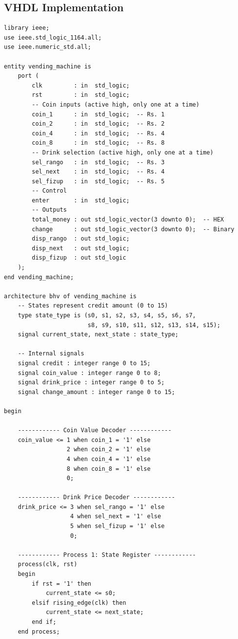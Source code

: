 \documentclass[12pt,a4paper]{article}
\begin{document}
\subsection{VHDL Implementation}

\begin{lstlisting}[caption={vending\_machine.vhd}]
library ieee;
use ieee.std_logic_1164.all;
use ieee.numeric_std.all;

entity vending_machine is
    port (
        clk         : in  std_logic;
        rst         : in  std_logic;
        -- Coin inputs (active high, only one at a time)
        coin_1      : in  std_logic;  -- Rs. 1
        coin_2      : in  std_logic;  -- Rs. 2
        coin_4      : in  std_logic;  -- Rs. 4
        coin_8      : in  std_logic;  -- Rs. 8
        -- Drink selection (active high, only one at a time)
        sel_rango   : in  std_logic;  -- Rs. 3
        sel_next    : in  std_logic;  -- Rs. 4
        sel_fizup   : in  std_logic;  -- Rs. 5
        -- Control
        enter       : in  std_logic;
        -- Outputs
        total_money : out std_logic_vector(3 downto 0);  -- HEX
        change      : out std_logic_vector(3 downto 0);  -- Binary
        disp_rango  : out std_logic;
        disp_next   : out std_logic;
        disp_fizup  : out std_logic
    );
end vending_machine;

architecture bhv of vending_machine is
    -- States represent credit amount (0 to 15)
    type state_type is (s0, s1, s2, s3, s4, s5, s6, s7, 
                        s8, s9, s10, s11, s12, s13, s14, s15);
    signal current_state, next_state : state_type;
    
    -- Internal signals
    signal credit : integer range 0 to 15;
    signal coin_value : integer range 0 to 8;
    signal drink_price : integer range 0 to 5;
    signal change_amount : integer range 0 to 15;
    
begin

    ------------ Coin Value Decoder ------------
    coin_value <= 1 when coin_1 = '1' else
                  2 when coin_2 = '1' else
                  4 when coin_4 = '1' else
                  8 when coin_8 = '1' else
                  0;

    ------------ Drink Price Decoder ------------
    drink_price <= 3 when sel_rango = '1' else
                   4 when sel_next = '1' else
                   5 when sel_fizup = '1' else
                   0;

    ------------ Process 1: State Register ------------
    process(clk, rst)
    begin
        if rst = '1' then
            current_state <= s0;
        elsif rising_edge(clk) then
            current_state <= next_state;
        end if;
    end process;


\end{lstlisting}
\end{document}

